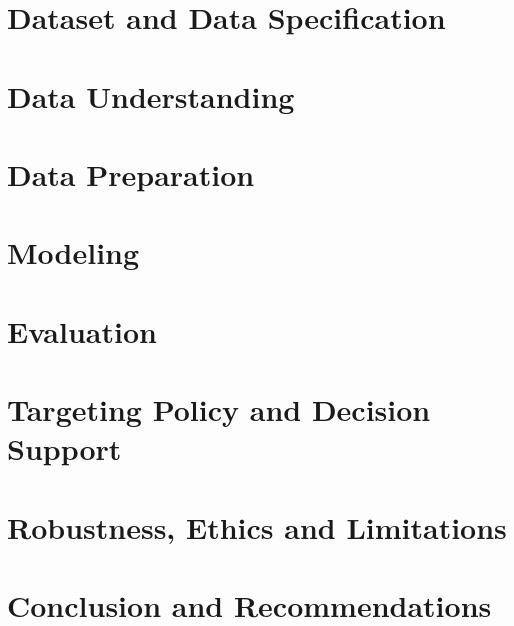 \documentclass[a4paper,11pt]{report}
\begin{document}
\chapter{Dataset and Data Specification}
\label{ch:dataset}


\chapter{Data Understanding}
\label{ch:data-understanding}


\chapter{Data Preparation}
\label{ch:data-preparation}


\chapter{Modeling}
\label{ch:modeling}


\chapter{Evaluation}
\label{ch:evaluation}


\chapter{Targeting Policy and Decision Support}
\label{ch:targeting-policy}


\chapter{Robustness, Ethics and Limitations}
\label{ch:robustness}


\chapter{Conclusion and Recommendations}
\label{ch:conclusion}

\end{document}
